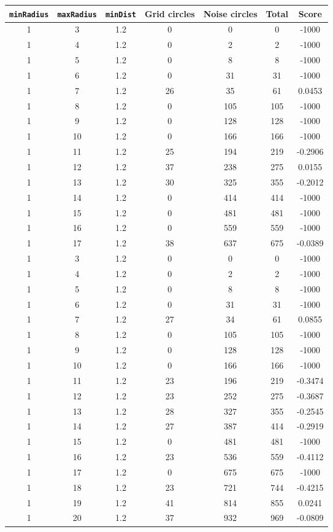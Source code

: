 \documentclass[letterpaper, 12pt]{article}
\begin{document}
\begin{longtable}{|c|c|c|c|c|c|c|}
\hline
\textbf{\texttt{minRadius}} & \textbf{\texttt{maxRadius}} & \textbf{\texttt{minDist}} & \textbf{Grid circles} & \textbf{Noise circles} & \textbf{Total} & \textbf{Score} \\
\hline
1 & 3 & 1.2 & 0 & 0 & 0 & -1000 \\
\hline
1 & 4 & 1.2 & 0 & 2 & 2 & -1000 \\
\hline
1 & 5 & 1.2 & 0 & 8 & 8 & -1000 \\
\hline
1 & 6 & 1.2 & 0 & 31 & 31 & -1000 \\
\hline
1 & 7 & 1.2 & 26 & 35 & 61 & 0.0453 \\
\hline
1 & 8 & 1.2 & 0 & 105 & 105 & -1000 \\
\hline
1 & 9 & 1.2 & 0 & 128 & 128 & -1000 \\
\hline
1 & 10 & 1.2 & 0 & 166 & 166 & -1000 \\
\hline
1 & 11 & 1.2 & 25 & 194 & 219 & -0.2906 \\
\hline
1 & 12 & 1.2 & 37 & 238 & 275 & 0.0155 \\
\hline
1 & 13 & 1.2 & 30 & 325 & 355 & -0.2012 \\
\hline
1 & 14 & 1.2 & 0 & 414 & 414 & -1000 \\
\hline
1 & 15 & 1.2 & 0 & 481 & 481 & -1000 \\
\hline
1 & 16 & 1.2 & 0 & 559 & 559 & -1000 \\
\hline
1 & 17 & 1.2 & 38 & 637 & 675 & -0.0389 \\
\hline
1 & 3 & 1.2 & 0 & 0 & 0 & -1000 \\
\hline
1 & 4 & 1.2 & 0 & 2 & 2 & -1000 \\
\hline
1 & 5 & 1.2 & 0 & 8 & 8 & -1000 \\
\hline
1 & 6 & 1.2 & 0 & 31 & 31 & -1000 \\
\hline
1 & 7 & 1.2 & 27 & 34 & 61 & 0.0855 \\
\hline
1 & 8 & 1.2 & 0 & 105 & 105 & -1000 \\
\hline
1 & 9 & 1.2 & 0 & 128 & 128 & -1000 \\
\hline
1 & 10 & 1.2 & 0 & 166 & 166 & -1000 \\
\hline
1 & 11 & 1.2 & 23 & 196 & 219 & -0.3474 \\
\hline
1 & 12 & 1.2 & 23 & 252 & 275 & -0.3687 \\
\hline
1 & 13 & 1.2 & 28 & 327 & 355 & -0.2545 \\
\hline
1 & 14 & 1.2 & 27 & 387 & 414 & -0.2919 \\
\hline
1 & 15 & 1.2 & 0 & 481 & 481 & -1000 \\
\hline
1 & 16 & 1.2 & 23 & 536 & 559 & -0.4112 \\
\hline
1 & 17 & 1.2 & 0 & 675 & 675 & -1000 \\
\hline
1 & 18 & 1.2 & 23 & 721 & 744 & -0.4215 \\
\hline
1 & 19 & 1.2 & 41 & 814 & 855 & 0.0241 \\
\hline
1 & 20 & 1.2 & 37 & 932 & 969 & -0.0809 \\
\hline
\end{longtable}
\end{document}

